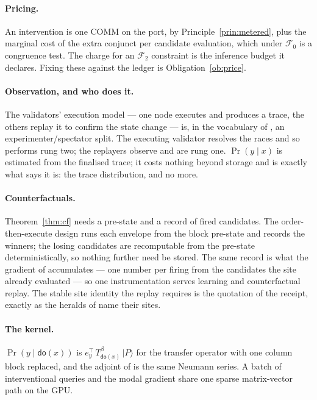 \documentclass[11pt,a4paper]{article}
\theoremstyle{plain}
\theoremstyle{definition}
\theoremstyle{remark}
\newcommand{\dok}{\textsf{do}}
\begin{document}
\paragraph{Pricing.} An intervention is one COMM on the port, by
Principle~\ref{prin:metered}, plus the marginal cost of the extra conjunct per
candidate evaluation, which under $\mathcal{F}_0$ is a congruence test. The
charge for an $\mathcal{F}_2$ constraint is the inference budget it declares.
Fixing these against the ledger is Obligation~\ref{ob:price}.

\paragraph{Observation, and who does it.} The validators' execution model ---
one node executes and produces a trace, the others replay it to confirm the
state change --- is, in the vocabulary of \cite{Inhabiting}, an
experimenter/spectator split. The executing validator resolves the races and
so performs rung two; the replayers observe and are rung one. $\Pr(y \mid x)$ is
estimated from the finalised trace; it costs nothing beyond storage and is
exactly what \cite[Prop.~4.1]{Inhabiting} says it is: the trace distribution,
and no more.

\paragraph{Counterfactuals.} Theorem~\ref{thm:cf} needs a pre-state and a
record of fired candidates. The order-then-execute design runs each envelope
from the block pre-state and records the winners; the losing candidates are
recomputable from the pre-state deterministically, so nothing further need be
stored. The same record is what the gradient of \cite[Cor.~5.7]{GradedPLN}
accumulates --- one number per firing from the candidates the site already
evaluated --- so one instrumentation serves learning and counterfactual replay.
The stable site identity the replay requires is the quotation of the receipt,
exactly as the heralds of \cite[\S9]{GradedV4} name their sites.

\paragraph{The kernel.} $\Pr(y \mid \dok(x))$ is $e_y^{\!\top}\, T_{\dok(x)}^{\beta}
\,\lvert P\rangle$ for the transfer operator with one column block replaced, and
the adjoint of \cite[Thm.~5.6]{GradedPLN} is the same Neumann series. A batch
of interventional queries and the modal gradient share one sparse matrix-vector
path on the GPU.
\end{document}
